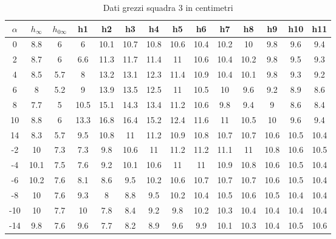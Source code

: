 \begin{table}[H]
\centering
\begin{tabular}{|c|c|c|c|c|c|c|c|c|c|c|c|c|c|}
\hline
$\alpha$ & $h_\infty$ & $h_{0\infty}$ & h1   & h2   & h3   & h4   & h5   & h6   & h7   & h8   & h9   & h10  & h11  \\ \hline
0        & 8.8        & 6             & 6    & 10.1 & 10.7 & 10.8 & 10.6 & 10.4 & 10.2 & 10   & 9.8  & 9.6  & 9.4  \\ \hline
2        & 8.7        & 6             & 6.6  & 11.3 & 11.7 & 11.4 & 11   & 10.6 & 10.4 & 10.2 & 9.8  & 9.5  & 9.3  \\ \hline
4        & 8.5        & 5.7           & 8    & 13.2 & 13.1 & 12.3 & 11.4 & 10.9 & 10.4 & 10.1 & 9.8  & 9.3  & 9.2  \\ \hline
6        & 8          & 5.2           & 9    & 13.9 & 13.5 & 12.5 & 11   & 10.5 & 10   & 9.6  & 9.2  & 8.9  & 8.6  \\ \hline
8        & 7.7        & 5             & 10.5 & 15.1 & 14.3 & 13.4 & 11.2 & 10.6 & 9.8  & 9.4  & 9    & 8.6  & 8.4  \\ \hline
10       & 8.8        & 6             & 13.3 & 16.8 & 16.4 & 15.2 & 12.4 & 11.6 & 11   & 10.5 & 10   & 9.6  & 9.4  \\ \hline
14       & 8.3        & 5.7           & 9.5  & 10.8 & 11   & 11.2 & 10.9 & 10.8 & 10.7 & 10.7 & 10.6 & 10.5 & 10.4 \\ \hline
-2       & 10         & 7.3           & 7.3  & 9.8  & 10.6 & 11   & 11.2 & 11.2 & 11.1 & 11   & 10.8 & 10.6 & 10.5 \\ \hline
-4       & 10.1       & 7.5           & 7.6  & 9.2  & 10.1 & 10.6 & 11   & 11   & 10.9 & 10.8 & 10.6 & 10.5 & 10.4 \\ \hline
-6       & 10.2       & 7.6           & 8.1  & 8.6  & 9.5  & 10.2 & 10.6 & 10.7 & 10.7 & 10.7 & 10.6 & 10.5 & 10.4 \\ \hline
-8       & 10         & 7.6           & 9.3  & 8    & 8.8  & 9.5  & 10.2 & 10.4 & 10.5 & 10.6 & 10.5 & 10.4 & 10.4 \\ \hline
-10      & 10         & 7.7           & 10   & 7.8  & 8.4  & 9.2  & 9.8  & 10.2 & 10.3 & 10.4 & 10.4 & 10.4 & 10.4 \\ \hline
-14      & 9.8        & 7.6           & 9.6  & 7.7  & 8.2  & 8.9  & 9.6  & 9.9  & 10.1 & 10.3 & 10.4 & 10.5 & 10.6 \\ \hline
\end{tabular}
\caption{Dati grezzi squadra 3 in centimetri}
\end{table}

